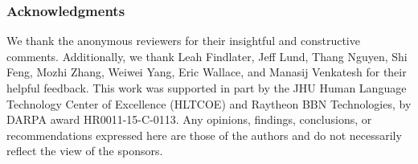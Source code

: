 \subsubsection*{Acknowledgments}

We thank the anonymous reviewers for their insightful
and constructive comments.  Additionally, we thank Leah Findlater, Jeff Lund, Thang Nguyen, Shi Feng, Mozhi Zhang, Weiwei Yang, Eric Wallace, and Manasij Venkatesh for their helpful feedback.  This work was supported in part by the JHU Human Language Technology
Center of Excellence (HLTCOE) and Raytheon BBN Technologies, by DARPA award
HR0011-15-C-0113.  Any opinions, findings, conclusions, or recommendations
expressed here are those of the authors
and do not necessarily reflect the view of the sponsors.  
